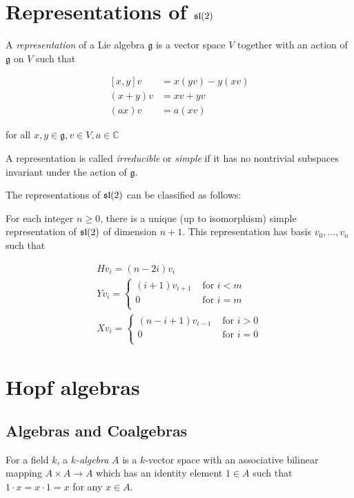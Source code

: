 \section{Representations of $\mathfrak{sl}(2)$}

A \emph{representation} of a Lie algebra $\mathfrak{g}$ is a vector space $V$
together with an action of $\mathfrak{g}$ on $V$ such that 

\begin{align*}
    \left[ x,y \right] v &= x(yv) - y(xv) \\
    (x+y)v &= xv + yv \\
    (ax)v &= a(xv)
\end{align*}

for all $x,y \in \mathfrak{g}, v \in V, a \in \mathbb{C}$

A representation is called \emph{irreducible} or \emph{simple} if it has no
nontrivial subspaces invariant under the action of $\mathfrak{g}$.

The representations of $\mathfrak{sl}(2)$ can be classified as follows: 

For each integer $n \geq 0$, there is a unique (up to isomorphism)
simple representation of $\mathfrak{sl}(2)$ of dimension $n+1$. This representation has
basis
$v_0, \ldots, v_{n}$ such that

\begin{align*}
    &H v_i = (n - 2i) v_i& \\
    &Y v_i = \begin{cases} 
                (i+1)v_{i+1}& \text{ for $i < m$} \\
                0& \text{ for $i = m$} \\
            \end{cases} \\
    &X v_i = \begin{cases} 
                (n-i+1)v_{i-1}& \text{ for $i > 0$} \\
                0& \text{ for $i = 0$} \\
            \end{cases}
\end{align*}



\section{Hopf algebras}
\subsection{Algebras and Coalgebras}
For a field $k$, a \emph{$k$-algebra} $A$ is a $k$-vector space with an
associative bilinear mapping $A \times A \to A$ which has an identity element
$1 \in A$ such that $1\cdot x = x\cdot 1 = x$ for any $x \in A$.

